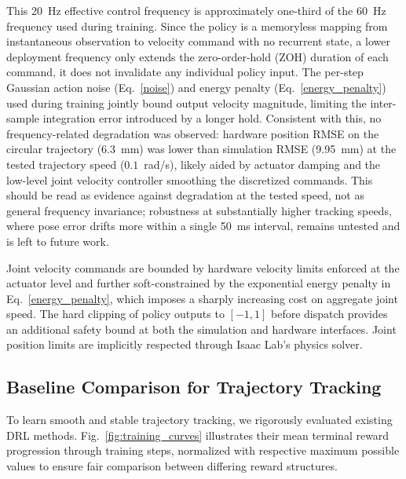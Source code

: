 \documentclass[preprint,12pt]{elsarticle}
\begin{document}
This 20~Hz effective control frequency is approximately one-third of the
60~Hz frequency used during training. Since the policy is a memoryless
mapping from instantaneous observation to velocity command with no
recurrent state, a lower deployment frequency only extends the
zero-order-hold (ZOH) duration of each command, it does not invalidate
any individual policy input. The per-step Gaussian action noise (Eq.~\ref{noise}) and energy penalty (Eq.~\ref{energy_penalty}) used during training jointly bound output velocity magnitude, limiting the inter-sample integration error introduced by a longer hold. Consistent with this, no frequency-related degradation was observed: hardware position RMSE on the circular trajectory (6.3~mm) was lower than simulation RMSE (9.95~mm) at the tested trajectory speed ($0.1$~rad/s), likely aided by actuator damping and the low-level joint velocity controller smoothing the discretized commands. This should be read as evidence against degradation at the tested speed, not as general frequency invariance; robustness at substantially higher tracking speeds, where pose error drifts more within a single 50~ms interval, remains untested and is left to future work.

Joint velocity commands are bounded by hardware velocity limits enforced at the actuator level and further soft-constrained by the exponential energy penalty in Eq.~\ref{energy_penalty}, which imposes a sharply increasing cost on aggregate joint speed. The hard clipping of policy outputs to $[-1,1]$ before dispatch provides an additional safety bound at both the simulation and hardware interfaces. Joint position limits are implicitly respected through Isaac Lab's physics solver.

\subsection{Baseline Comparison for Trajectory Tracking}
\label{reward_ablation}
To learn smooth and stable trajectory tracking, we rigorously evaluated existing DRL methods. Fig.~\ref{fig:training_curves} illustrates their mean terminal reward progression through training steps, normalized with respective maximum possible values to ensure fair comparison between differing reward structures.
\end{document}
